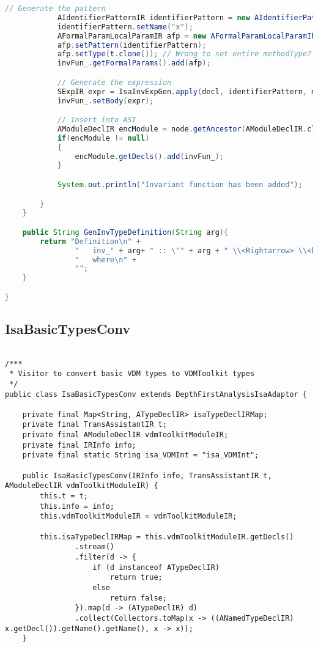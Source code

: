 \begin{appendices}
\begin{lstlisting}[language=Java]
            // Generate the pattern
            AIdentifierPatternIR identifierPattern = new AIdentifierPatternIR();
            identifierPattern.setName("x");
            AFormalParamLocalParamIR afp = new AFormalParamLocalParamIR();
            afp.setPattern(identifierPattern);
            afp.setType(t.clone()); // Wrong to set entire methodType?
            invFun_.getFormalParams().add(afp);

            // Generate the expression
            SExpIR expr = IsaInvExpGen.apply(decl, identifierPattern, methodType.clone(), isaFuncDeclIRMap);
            invFun_.setBody(expr);

            // Insert into AST
            AModuleDeclIR encModule = node.getAncestor(AModuleDeclIR.class);
            if(encModule != null)
            {
                encModule.getDecls().add(invFun_);
            }

            System.out.println("Invariant function has been added");

        }
    }

    public String GenInvTypeDefinition(String arg){
        return "Definition\n" +
                "   inv_" + arg+ " :: \"" + arg + " \\<Rightarrow> \\<bool>\"\n" +
                "   where\n" +
                "";
    }

}
\end{lstlisting}

\subsection{IsaBasicTypesConv} \label{IsaBasicTypesConvbefore}
\begin{lstlisting}

/***
 * Visitor to convert basic VDM types to VDMToolkit types
 */
public class IsaBasicTypesConv extends DepthFirstAnalysisIsaAdaptor {

    private final Map<String, ATypeDeclIR> isaTypeDeclIRMap;
    private final TransAssistantIR t;
    private final AModuleDeclIR vdmToolkitModuleIR;
    private final IRInfo info;
    private final static String isa_VDMInt = "isa_VDMInt";

    public IsaBasicTypesConv(IRInfo info, TransAssistantIR t, AModuleDeclIR vdmToolkitModuleIR) {
        this.t = t;
        this.info = info;
        this.vdmToolkitModuleIR = vdmToolkitModuleIR;

        this.isaTypeDeclIRMap = this.vdmToolkitModuleIR.getDecls()
                .stream()
                .filter(d -> {
                    if (d instanceof ATypeDeclIR)
                        return true;
                    else
                        return false;
                }).map(d -> (ATypeDeclIR) d)
                .collect(Collectors.toMap(x -> ((ANamedTypeDeclIR) x.getDecl()).getName().getName(), x -> x));
    }


\end{lstlisting}
\end{appendices}
